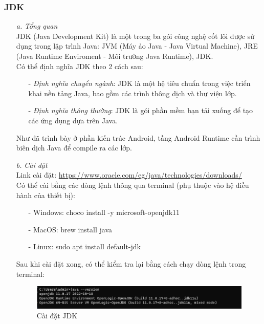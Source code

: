 \subsubsection{JDK}
\begin{enumerate}
    \item[\textit{a.}] {\textit{Tổng quan}}\\
    JDK (Java Development Kit) là một trong ba gói công nghệ cốt lõi được sử dụng trong lập trình Java: JVM (Máy ảo Java - Java Virtual Machine), JRE (Java Runtime Enviroment - Môi trường Java Runtime), JDK.\\
    Có thể định nghĩa JDK theo 2 cách sau:
    \begin{enumerate}
        \item[-] {\textit{Định nghĩa chuyển ngành}}: JDK là một hệ tiêu chuẩn trong việc triển khai nền tảng Java, bao gồm các trình thông dịch và thư viện lớp.
        \item[-] {\textit{Định nghĩa thông thường}}: JDK là gói phần mềm bạn tải xuống để tạo các ứng dụng dựa trên Java.
    \end{enumerate}
    Như đã trình bày ở phần kiến trúc Android, tầng Android Runtime cần trình biên dịch Java để compile ra các lớp.
    \item[\textit{b.}] {\textit{Cài đặt}}\\
    Link cài đặt: \url{https://www.oracle.com/eg/java/technologies/downloads/}\\
    Có thể cài bằng các dòng lệnh thông qua terminal (phụ thuộc vào hệ điều hành của thiết bị):
    \begin{enumerate}
        \item[-] {Windows}: choco install -y microsoft-openjdk11
        \item[-] {MacOS}: brew install java
        \item[-] {Linux}: sudo apt install default-jdk
    \end{enumerate}
    Sau khi cài đặt xong, có thể kiểm tra lại bằng cách chạy dòng lệnh trong terminal:
    \begin{figure}[!ht]
        \centering
        \includegraphics[width=1\textwidth]{images/checkJDK.png}
        \caption{Cài đặt JDK}
    \end{figure}
\end{enumerate}
